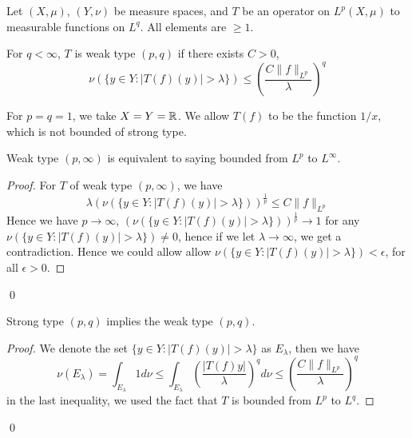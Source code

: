 Let $(X,\mu)$, $(Y,\nu)$ be measure spaces, and $T$ be an operator on $L^p(X,\mu)$ to measurable functions on $L^q$. All elements are $\geq 1$.
\begin{definition}
    For $q<\infty$, $T$ is weak type $(p,q)$ if there exists $C>0$,
    \begin{equation*}
        \nu\left(\{y\in Y: |T(f)(y)|>\lambda\} \right)\leq\left(\frac{C\|f\|_{L^p}}{\lambda} \right)^q
    \end{equation*}
\end{definition}
\begin{example}
    For $p=q=1$, we take $X=Y=\mathbb{R}$. We allow $T(f)$ to be the function $1/x$, which is not bounded of strong type.
\end{example}

\begin{exercise}
    Weak type $(p,\infty)$ is equivalent to saying bounded from $L^p$ to $L^\infty$.
\end{exercise}
\begin{proof}
    For $T$ of weak type $(p,\infty)$, we have
    \begin{equation*}
        \lambda\left(\nu\left(\{y\in Y: |T(f)(y)|>\lambda\} \right) \right)^\frac{1}{p}\leq C\|f\|_{L^p}
    \end{equation*}
    Hence we have $p\to\infty$, $(\nu\left(\{y\in Y: |T(f)(y)|>\lambda\} \right))^\frac{1}{p}\to 1$ for any $\nu\left(\{y\in Y: |T(f)(y)|>\lambda\} \right)\neq 0$, hence if we let $\lambda\to\infty$, we get a contradiction. Hence we could allow allow $\nu\left(\{y\in Y: |T(f)(y)|>\lambda\} \right)<\epsilon$, for all $\epsilon>0$.
\end{proof}
\qed

\begin{exercise}
Strong type $(p,q)$ implies the weak type $(p,q)$.
\end{exercise}
\begin{proof}
    We denote the set $\{y\in Y: |T(f)(y)|>\lambda\}$ as $E_\lambda$, then we have
    \begin{equation*}
        \nu(E_\lambda)=\int_{E_\lambda}1d\nu\leq\int_{E_\lambda}\left(\frac{|T(f)y|}{\lambda}\right)^qd\nu\leq\left(\frac{C\|f\|_{L^p}}{\lambda}\right)^q
    \end{equation*}
    in the last inequality, we used the fact that $T$ is bounded from $L^p$ to $L^q$.
\end{proof}
\qed

